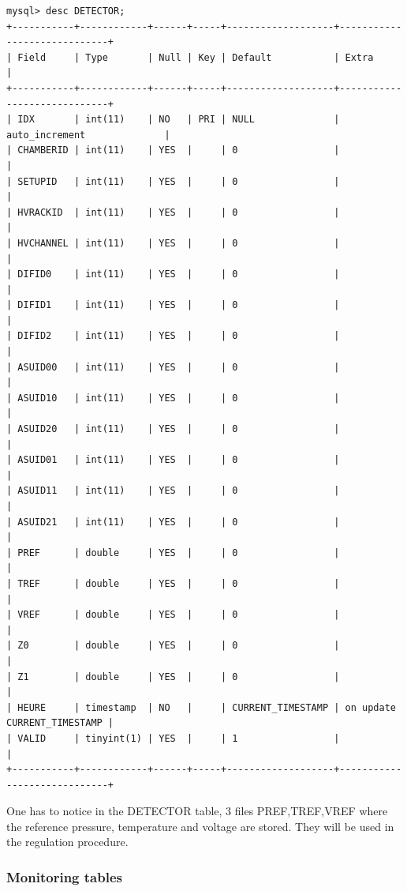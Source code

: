 \documentclass[english]{article}
\begin{document}
\begin{verbatim}
mysql> desc DETECTOR;
+-----------+------------+------+-----+-------------------+-----------------------------+
| Field     | Type       | Null | Key | Default           | Extra                       |
+-----------+------------+------+-----+-------------------+-----------------------------+
| IDX       | int(11)    | NO   | PRI | NULL              | auto_increment              |
| CHAMBERID | int(11)    | YES  |     | 0                 |                             |
| SETUPID   | int(11)    | YES  |     | 0                 |                             |
| HVRACKID  | int(11)    | YES  |     | 0                 |                             |
| HVCHANNEL | int(11)    | YES  |     | 0                 |                             |
| DIFID0    | int(11)    | YES  |     | 0                 |                             |
| DIFID1    | int(11)    | YES  |     | 0                 |                             |
| DIFID2    | int(11)    | YES  |     | 0                 |                             |
| ASUID00   | int(11)    | YES  |     | 0                 |                             |
| ASUID10   | int(11)    | YES  |     | 0                 |                             |
| ASUID20   | int(11)    | YES  |     | 0                 |                             |
| ASUID01   | int(11)    | YES  |     | 0                 |                             |
| ASUID11   | int(11)    | YES  |     | 0                 |                             |
| ASUID21   | int(11)    | YES  |     | 0                 |                             |
| PREF      | double     | YES  |     | 0                 |                             |
| TREF      | double     | YES  |     | 0                 |                             |
| VREF      | double     | YES  |     | 0                 |                             |
| Z0        | double     | YES  |     | 0                 |                             |
| Z1        | double     | YES  |     | 0                 |                             |
| HEURE     | timestamp  | NO   |     | CURRENT_TIMESTAMP | on update CURRENT_TIMESTAMP |
| VALID     | tinyint(1) | YES  |     | 1                 |                             |
+-----------+------------+------+-----+-------------------+-----------------------------+

\end{verbatim}

One has to notice in the DETECTOR table, 3 files PREF,TREF,VREF where the reference pressure, temperature and voltage are stored. They will  be used in the regulation procedure.
\subsubsection{Monitoring tables}
\end{document}

